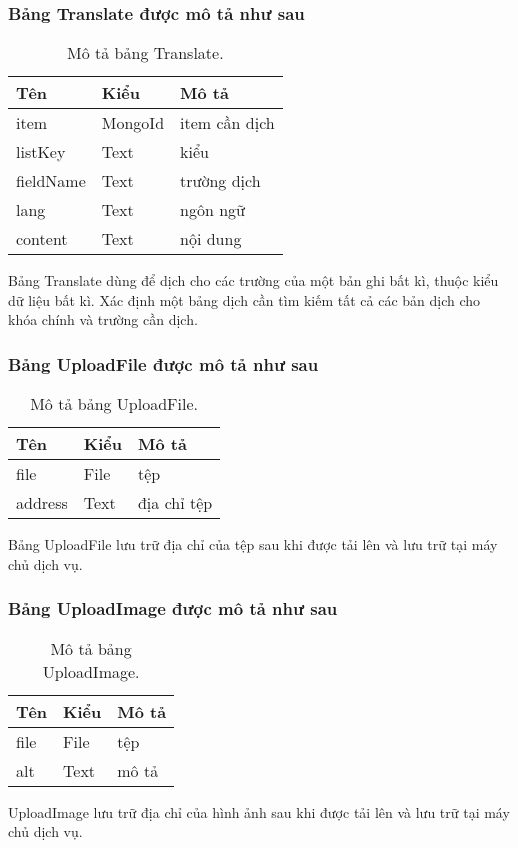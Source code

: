 \subsubsection{Bảng Translate được mô tả như sau}
\begin{table}[!htbp]\fontsize{13px}{13px}\selectfont\justifying
\begin{center}
\caption{Mô tả bảng Translate.}
\begin{tabularx}{0.6\textwidth}{ |l|l|X| } 
\hline
Tên & Kiểu & Mô tả \\
\hline
item & MongoId & item cần dịch \\
listKey & Text & kiểu \\
fieldName & Text & trường dịch \\
lang & Text & ngôn ngữ\\
content & Text & nội dung\\
\hline
\end{tabularx}
\label{table:Translate}
\end{center}
Bảng Translate dùng để dịch cho các trường của một bản ghi bất kì, thuộc kiểu dữ liệu bất kì. Xác định một bảng dịch cần tìm kiếm tất cả các bản dịch cho khóa chính và trường cần dịch.
\end{table}

\subsubsection{Bảng UploadFile được mô tả như sau}	
\begin{table}[!htbp]\fontsize{13px}{13px}\selectfont\justifying
\begin{center}
\caption{Mô tả bảng UploadFile.}
\begin{tabularx}{0.6\textwidth}{ |l|l|X| } 
\hline
Tên & Kiểu & Mô tả \\
\hline
file & File & tệp \\
address & Text & địa chỉ tệp\\ 
\hline
\end{tabularx}
\label{table:UploadFile}
\end{center}
Bảng UploadFile lưu trữ địa chỉ của tệp sau khi được tải lên và lưu trữ tại máy chủ dịch vụ.
\end{table}

\subsubsection{Bảng UploadImage được mô tả như sau}
\begin{table}[!htbp]\fontsize{13px}{13px}\selectfont\justifying
\begin{center}
\caption{Mô tả bảng UploadImage.}
\begin{tabularx}{0.6\textwidth}{ |l|l|X| } 
\hline
Tên & Kiểu & Mô tả \\
\hline
file & File & tệp \\
alt & Text & mô tả \\ 
\hline
\end{tabularx}
\label{table:UploadImage}
\end{center}
UploadImage lưu trữ địa chỉ của hình ảnh sau khi được tải lên và lưu trữ tại máy chủ dịch vụ.
\end{table}
\clearpage

